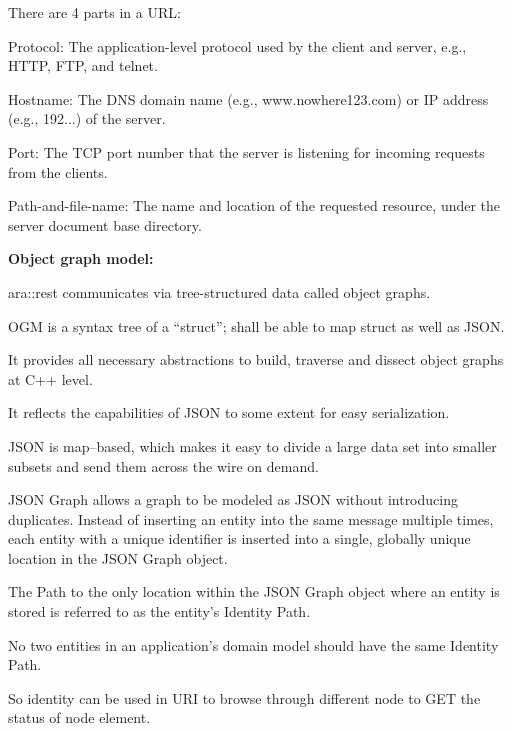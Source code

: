 \begin{DoxyItemize}
\begin{DoxyItemize}
\begin{DoxyItemize}
\item There are 4 parts in a U\+RL\+:
\begin{DoxyItemize}
\item Protocol\+: The application-\/level protocol used by the client and server, e.\+g., H\+T\+TP, F\+TP, and telnet.
\item Hostname\+: The D\+NS domain name (e.\+g., www.\+nowhere123.\+com) or IP address (e.\+g., 192...) of the server.
\item Port\+: The T\+CP port number that the server is listening for incoming requests from the clients.
\item Path-\/and-\/file-\/name\+: The name and location of the requested resource, under the server document base directory.
\end{DoxyItemize}
\end{DoxyItemize}
\item {\bfseries Object graph model\+:}
\begin{DoxyItemize}
\item ara\+::rest communicates via tree-\/structured data called object graphs.
\item O\+GM is a syntax tree of a “struct”; shall be able to map struct as well as J\+S\+ON.
\item It provides all necessary abstractions to build, traverse and dissect object graphs at C++ level.
\item It reflects the capabilities of J\+S\+ON to some extent for easy serialization.
\item J\+S\+ON is map–based, which makes it easy to divide a large data set into smaller subsets and send them across the wire on demand.
\item J\+S\+ON Graph allows a graph to be modeled as J\+S\+ON without introducing duplicates. Instead of inserting an entity into the same message multiple times, each entity with a unique identifier is inserted into a single, globally unique location in the J\+S\+ON Graph object.
\item The Path to the only location within the J\+S\+ON Graph object where an entity is stored is referred to as the entity’s Identity Path.
\item No two entities in an application’s domain model should have the same Identity Path.
\item So identity can be used in U\+RI to browse through different node to G\+ET the status of node element. 
\end{DoxyItemize}
\end{DoxyItemize}
\end{DoxyItemize}

